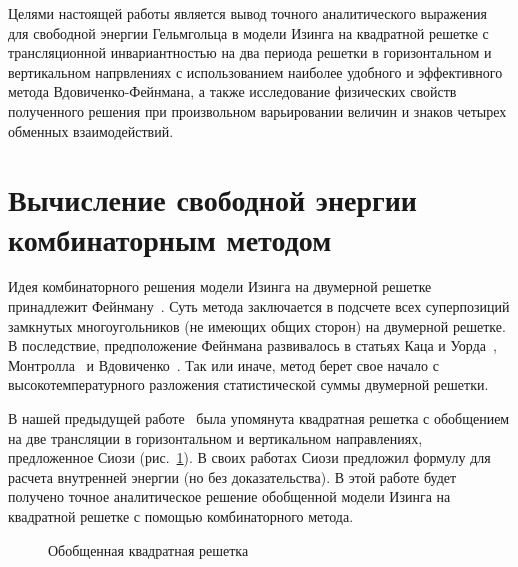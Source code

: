 \documentclass[utf8,12pt]{jetp}
\begin{document}
Целями настоящей работы является вывод точного аналитического выражения для свободной энергии Гельмгольца в модели Изинга на квадратной решетке с трансляционной инвариантностью на два периода решетки в горизонтальном и вертикальном напрвлениях с использованием наиболее удобного и эффективного метода Вдовиченко-Фейнмана, а также исследование физических свойств полученного решения при произвольном варьировании величин и знаков четырех обменных взаимодействий.

\section{Вычисление свободной энергии комбинаторным методом}

Идея комбинаторного решения модели Изинга на двумерной решетке принадлежит Фейнману~\cite{feynmann1978}. Суть метода заключается в подсчете всех суперпозиций замкнутых многоугольников (не имеющих общих сторон) на двумерной решетке. В последствие, предположение Фейнмана развивалось в статьях Каца и Уорда~\cite{kac1952}, Монтролла~\cite{montroll1953} и Вдовиченко~\cite{vdovichenko1965}. Так или иначе, метод берет свое начало с высокотемпературного разложения статистической суммы двумерной решетки. 

В нашей предыдущей работе~\cite{generalizedIsing2021} была упомянута квадратная решетка с обобщением на две трансляции в горизонтальном и вертикальном направлениях, предложенное Сиози (рис.~\ref{gen}). В своих работах Сиози \cite{syozi1, syozi2} предложил формулу для расчета внутренней энергии (но без доказательства). В этой работе будет получено точное аналитическое решение обобщенной модели Изинга на квадратной решетке с помощью комбинаторного метода.

\begin{figure}[h]
	\caption{Обобщенная квадратная решетка}
	\label{gen}
\end{figure}
\end{document}
